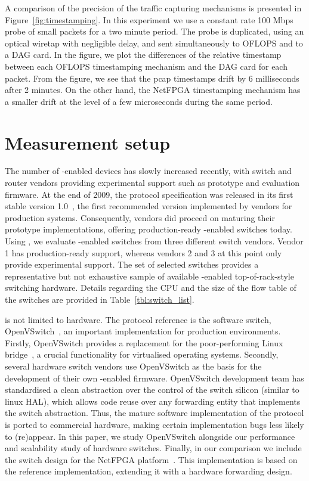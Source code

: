 A comparison of the precision of the traffic capturing mechanisms is 
presented in Figure~\ref{fig:timestamping}. In this experiment we 
use a constant rate 100 Mbps probe of small packets for a two minute 
period. The probe is duplicated, using an optical wiretap with negligible 
delay, and sent simultaneously to OFLOPS and to a DAG card. In the figure, 
we plot the differences of the relative timestamp between each OFLOPS 
timestamping mechanism and the DAG card for each packet. From the figure, 
we see that the pcap timestamps drift by 6 milliseconds after 2 minutes.
On the other hand, the NetFPGA timestamping mechanism has a smaller
drift at the level of a few microseconds during the same period.

\section{Measurement setup}\label{sec:oflops-switches}

The number of \of-enabled devices has slowly increased recently, with switch and
router vendors providing experimental \of support such as prototype and
evaluation firmware. At the end of 2009, the \of protocol specification was
released in its first stable version 1.0~\cite{openflow-spec}, the first
recommended version implemented by vendors for production systems.
Consequently, vendors did proceed on maturing their prototype implementations,
offering production-ready \of-enabled switches today. Using \oflops, we evaluate
\of-enabled switches from three different switch vendors.  Vendor 1 has
production-ready \of support, whereas vendors 2 and 3 at this point only provide
experimental \of support.  The set of selected switches provides a
representative but not exhaustive sample of available \of-enabled
top-of-rack-style switching hardware. Details regarding the CPU and the size of
the flow table of the switches are provided in Table~\ref{tbl:switch_list}.

\of is not limited to hardware. The \of protocol reference is the software
switch, OpenVSwitch~\cite{openvswitch}, an important implementation for
production environments. Firstly, OpenVSwitch provides a replacement for the
poor-performing Linux bridge~\cite{bianco10}, a crucial functionality for
virtualised operating systems.  Secondly, several hardware switch vendors use
OpenVSwitch as the basis for the development of their own \of-enabled firmware.
OpenVSwitch development team has standardised a clean abstraction over the
control of the switch silicon (similar to linux HAL), which allows code reuse
over any forwarding entity that implements the switch abstraction. Thus, the
mature software implementation of the \of protocol is ported to commercial
hardware, making certain implementation bugs less likely to (re)appear.  In this
paper, we study OpenVSwitch alongside our performance and scalability study of
hardware switches. Finally, in our comparison we include the \of switch design
for the NetFPGA platform~\cite{openflow-netfpga}. This implementation is based
on the \of reference implementation, extending it with a hardware forwarding
design. 

